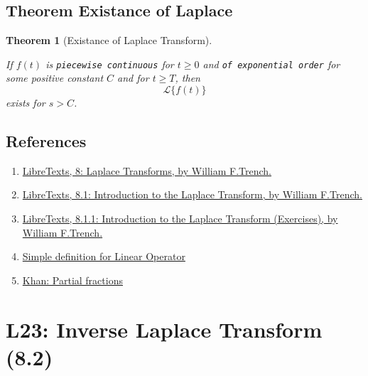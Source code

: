 \documentclass[
  letterpaper,
  DIV=11,
  numbers=noendperiod]{scrreprt}
\theoremstyle{plain}
\newtheorem{theorem}{Theorem}[chapter]
\theoremstyle{remark}
\begin{document}
\section{Theorem Existance of
Laplace}\label{theorem-existance-of-laplace}

\begin{theorem}[Existance of Laplace
Transform]\protect\hypertarget{thm-ExistLaplace}{}\label{thm-ExistLaplace}

If \(f(t)\) is \texttt{piecewise\ continuous} for \(t\geq 0\) and
\texttt{of\ exponential\ order} for some positive constant \(C\) and for
\(t\geq T\), then \[\mathscr{L}\{f(t)\}\] exists for \(s>C\).

\end{theorem}

\section{References}\label{references-4}

\begin{enumerate}
\def\labelenumi{\arabic{enumi}.}
\setcounter{enumi}{-1}
\item
  \href{https://math.libretexts.org/Courses/Monroe_Community_College/MTH_225_Differential_Equations/8\%3A_Laplace_Transforms}{LibreTexts,
  8: Laplace Transforms, by William F.Trench.}
\item
  \href{https://math.libretexts.org/Courses/Monroe_Community_College/MTH_225_Differential_Equations/8\%3A_Laplace_Transforms/8.1\%3A_Introduction_to_the_Laplace_Transform}{LibreTexts,
  8.1: Introduction to the Laplace Transform, by William F.Trench.}
\item
  \href{https://math.libretexts.org/Courses/Monroe_Community_College/MTH_225_Differential_Equations/8\%3A_Laplace_Transforms/8.1\%3A_Introduction_to_the_Laplace_Transform/8.1.1\%3A_Introduction_to_the_Laplace_Transform_(Exercises)}{LibreTexts,
  8.1.1: Introduction to the Laplace Transform (Exercises), by William
  F.Trench.}
\item
  \href{https://undergroundmathematics.org/glossary/linear-operator}{Simple
  definition for Linear Operator}
\item
  \href{https://www.khanacademy.org/math/algebra-home/alg-rational-expr-eq-func/alg-partial-fraction/v/partial-fraction-expansion-1}{Khan:
  Partial fractions}
\end{enumerate}


\chapter{L23: Inverse Laplace Transform
(8.2)}\label{l23-inverse-laplace-transform-8.2-1}
\end{document}
